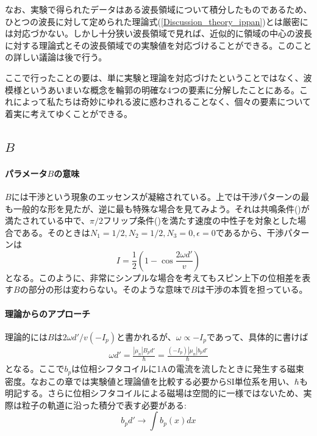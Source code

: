 なお、実験で得られたデータはある波長領域について積分したものであるため、ひとつの波長に対して定められた理論式(\ref{Discussion_theory_ippan})とは厳密には対応づかない。しかし十分狭い波長領域で見れば、近似的に領域の中心の波長に対する理論式とその波長領域での実験値を対応づけることができる。このことの詳しい議論は後で行う。

ここで行ったことの要は、単に実験と理論を対応づけたということではなく、波模様というあいまいな概念を輪郭の明確な4つの要素に分解したことにある。これによって私たちは奇妙にゆれる波に惑わされることなく、個々の要素について着実に考えてゆくことができる。

\subsection{$B$}
\paragraph{パラメータ$B$の意味}
$B$には干渉という現象のエッセンスが凝縮されている。上では干渉パターンの最も一般的な形を見たが、逆に最も特殊な場合を見てみよう。それは共鳴条件()が満たされている中で、$\pi/2$フリップ条件()を満たす速度の中性子を対象とした場合である。そのときは$N_1=1/2,N_2=1/2,N_3=0,\epsilon=0$であるから、干渉パターンは
\begin{equation}
I=\frac{1}{2}\left(1-\cos\frac{2\omega d'}{v}\right) \label{Discussion_theory_simple}
\end{equation}
となる。このように、非常にシンプルな場合を考えてもスピン上下の位相差を表す$B$の部分の形は変わらない。そのような意味で$B$は干渉の本質を担っている。

\paragraph{理論からのアプローチ}
理論的には$B$は$2\omega d'/v(-I_p)$と書かれるが、$\omega \propto -I_p$であって、具体的に書けば
\begin{align}
\omega d'=\frac{|\mu_n|B_p d'}{\hbar}=\frac{(-I_p)|\mu_n| b_p d'}{\hbar}
\end{align}
となる。ここで$b_p$は位相シフタコイルに1Aの電流を流したときに発生する磁束密度。なおこの章では実験値と理論値を比較する必要からSI単位系を用い、$\hbar$も明記する。さらに位相シフタコイルによる磁場は空間的に一様ではないため、実際は粒子の軌道に沿った積分で表す必要がある:
\begin{equation}
b_p d' \rightarrow \int b_p(x) dx
\end{equation}

